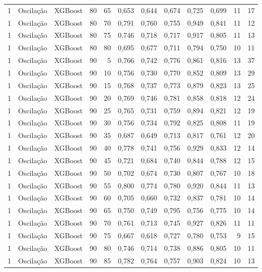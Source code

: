 \begin{longtable}{@{}rllrrrrrrrrr@{}}
1 & Oscilação & XGBoost & 80 & 65 & 0,653 & 0,644 & 0,674 & 0,725 & 0,699 & 11 & 17 \\
1 & Oscilação & XGBoost & 80 & 70 & 0,791 & 0,760 & 0,755 & 0,949 & 0,841 & 11 & 12 \\
1 & Oscilação & XGBoost & 80 & 75 & 0,746 & 0,718 & 0,717 & 0,917 & 0,805 & 11 & 13 \\
1 & Oscilação & XGBoost & 80 & 80 & 0,695 & 0,677 & 0,711 & 0,794 & 0,750 & 10 & 11 \\
1 & Oscilação & XGBoost & 90 & 5 & 0,766 & 0,742 & 0,776 & 0,861 & 0,816 & 13 & 37 \\
1 & Oscilação & XGBoost & 90 & 10 & 0,756 & 0,730 & 0,770 & 0,852 & 0,809 & 13 & 29 \\
1 & Oscilação & XGBoost & 90 & 15 & 0,768 & 0,737 & 0,773 & 0,879 & 0,823 & 13 & 25 \\
1 & Oscilação & XGBoost & 90 & 20 & 0,769 & 0,746 & 0,781 & 0,858 & 0,818 & 12 & 24 \\
1 & Oscilação & XGBoost & 90 & 25 & 0,765 & 0,731 & 0,759 & 0,894 & 0,821 & 12 & 19 \\
1 & Oscilação & XGBoost & 90 & 30 & 0,756 & 0,734 & 0,792 & 0,825 & 0,808 & 11 & 19 \\
1 & Oscilação & XGBoost & 90 & 35 & 0,687 & 0,649 & 0,713 & 0,817 & 0,761 & 12 & 20 \\
1 & Oscilação & XGBoost & 90 & 40 & 0,778 & 0,741 & 0,756 & 0,929 & 0,833 & 12 & 14 \\
1 & Oscilação & XGBoost & 90 & 45 & 0,721 & 0,684 & 0,740 & 0,844 & 0,788 & 12 & 15 \\
1 & Oscilação & XGBoost & 90 & 50 & 0,702 & 0,674 & 0,730 & 0,807 & 0,767 & 10 & 18 \\
1 & Oscilação & XGBoost & 90 & 55 & 0,800 & 0,774 & 0,780 & 0,920 & 0,844 & 11 & 13 \\
1 & Oscilação & XGBoost & 90 & 60 & 0,705 & 0,660 & 0,732 & 0,837 & 0,781 & 10 & 14 \\
1 & Oscilação & XGBoost & 90 & 65 & 0,750 & 0,749 & 0,795 & 0,756 & 0,775 & 10 & 14 \\
1 & Oscilação & XGBoost & 90 & 70 & 0,761 & 0,713 & 0,745 & 0,927 & 0,826 & 11 & 11 \\
1 & Oscilação & XGBoost & 90 & 75 & 0,667 & 0,618 & 0,727 & 0,780 & 0,753 & 9 & 15 \\
1 & Oscilação & XGBoost & 90 & 80 & 0,746 & 0,714 & 0,738 & 0,886 & 0,805 & 10 & 11 \\
1 & Oscilação & XGBoost & 90 & 85 & 0,782 & 0,764 & 0,757 & 0,903 & 0,824 & 10 & 13 \\

\end{longtable}
